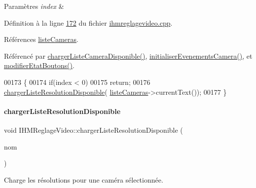 \begin{DoxyParams}{Paramètres}
{\em index} & \\
\hline
\end{DoxyParams}


Définition à la ligne \hyperlink{ihmreglagevideo_8cpp_source_l00172}{172} du fichier \hyperlink{ihmreglagevideo_8cpp_source}{ihmreglagevideo.\+cpp}.



Références \hyperlink{ihmreglagevideo_8h_source_l00038}{liste\+Cameras}.



Référencé par \hyperlink{ihmreglagevideo_8cpp_source_l00132}{charger\+Liste\+Camera\+Disponible()}, \hyperlink{ihmreglagevideo_8cpp_source_l00117}{initialiser\+Evenements\+Camera()}, et \hyperlink{ihmreglagevideo_8cpp_source_l00212}{modifier\+Etat\+Boutons()}.


\begin{DoxyCode}
00173 \{
00174     \textcolor{keywordflow}{if}(index < 0)
00175         \textcolor{keywordflow}{return};
00176     \hyperlink{class_i_h_m_reglage_video_a26dc15cf9453af24c464f0d6aebb42df}{chargerListeResolutionDisponible}(
      \hyperlink{class_i_h_m_reglage_video_a38a35548ddd0e5750917305ac6f32142}{listeCameras}->currentText());
00177 \}
\end{DoxyCode}
\mbox{\label{class_i_h_m_reglage_video_a25c0537f7d5b735f80f46f2ae993f424}} 
\paragraph{\texorpdfstring{charger\+Liste\+Resolution\+Disponible}{chargerListeResolutionDisponible}\hspace{0.1cm}{\footnotesize\ttfamily [2/2]}}
{\footnotesize\ttfamily void I\+H\+M\+Reglage\+Video\+::charger\+Liste\+Resolution\+Disponible (\begin{DoxyParamCaption}\item[{Q\+String}]{nom }\end{DoxyParamCaption})\hspace{0.3cm}{\ttfamily [slot]}}



Charge les résolutions pour une caméra sélectionnée. 


